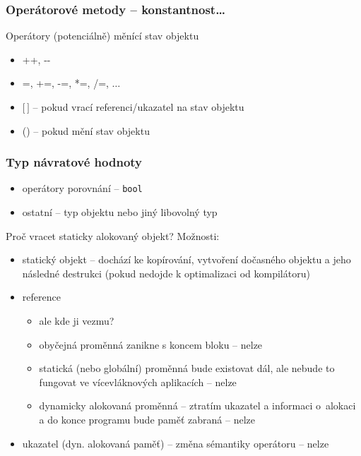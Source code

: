 \begin{frame}[fragile]
\frametitle{Operátorové metody -- konstantnost\ldots}
\begin{block}{} 
Operátory (potenciálně) měnící stav objektu
\begin{itemize}
\item ++, -\/-
\item =, +=, -=, *=, /=, $\ldots$
\item $[$\,$]$ -- pokud vrací referenci/ukazatel na stav objektu
\item () -- pokud mění stav objektu
\end{itemize}
\end{block}
\end{frame}









\begin{frame}[fragile]
\frametitle{Typ návratové hodnoty}
\begin{block}{}
\begin{itemize}
\item operátory porovnání -- \lstinline|bool|
\item ostatní -- typ objektu nebo jiný libovolný typ
\end{itemize}
\end{block}

\begin{block}{} 
Proč vracet staticky alokovaný objekt? Možnosti:
\begin{itemize}
\item statický objekt -- dochází ke kopírování, vytvoření dočasného objektu a jeho následné destrukci (pokud nedojde k optimalizaci od kompilátoru)
\item reference
\begin{itemize}
\item ale kde ji vezmu?
\item obyčejná proměnná zanikne s koncem bloku -- nelze
\item statická (nebo globální) proměnná bude existovat dál, ale nebude to fungovat ve vícevláknových aplikacích -- nelze
\item dynamicky alokovaná proměnná -- ztratím ukazatel a informaci o~alokaci a do konce programu bude paměť zabraná -- nelze
\end{itemize}
\item ukazatel (dyn. alokovaná paměť) -- změna sémantiky operátoru -- nelze
\end{itemize}
\end{block}
\end{frame}






